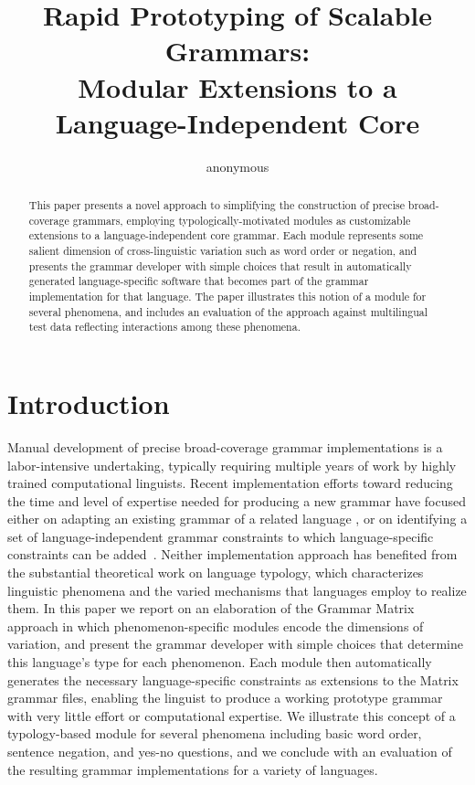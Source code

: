 \documentclass[11pt]{article}
\title{Rapid Prototyping of Scalable Grammars:\\
       Modular Extensions to a Language-Independent Core}
\author{anonymous}
\date{}
\begin{document}
\maketitle
\begin{abstract}
This paper presents a novel approach to simplifying the construction of 
precise broad-coverage grammars, employing typologically-motivated modules
as customizable extensions to a language-independent core grammar.  Each
module represents some salient dimension of cross-linguistic variation such
as word order or negation, and presents the grammar developer with simple 
choices that result in automatically generated language-specific software 
that becomes part of the grammar implementation for that language.  The 
paper illustrates this notion of a module for several phenomena, and 
includes an evaluation of the approach against multilingual test data
reflecting interactions among these phenomena.
\end{abstract}

\section{Introduction}
Manual development of precise broad-coverage grammar implementations
is a labor-intensive undertaking, typically requiring multiple years
of work by highly trained computational linguists.  Recent implementation
efforts toward reducing the time and level of expertise needed for producing
a new grammar have focused either on adapting an existing grammar of a
related language \cite{Butt-et-al-02,Kim:Dal:Kap:Kin:Mas:Ohk:03}, or
on identifying a set of language-independent grammar constraints to
which language-specific constraints can be added~\cite{Ben:Fli:Oe:02}.
Neither implementation approach has benefited from the substantial
theoretical work on language typology, which characterizes linguistic
phenomena and the varied mechanisms that languages employ to realize
them.  In this paper we report on an elaboration of the Grammar Matrix
approach in which phenomenon-specific modules encode the dimensions of
variation, and present the grammar developer with simple choices that
determine this language's type for each phenomenon. Each module then
automatically generates the necessary language-specific constraints as
extensions to the Matrix grammar files, enabling the linguist to
produce a working prototype grammar with very little effort or
computational expertise.  We illustrate this concept of a
typology-based module for several phenomena including basic word
order, sentence negation, and yes-no questions, and we conclude with
an evaluation of the resulting grammar implementations for a variety
of languages.
\end{document}

